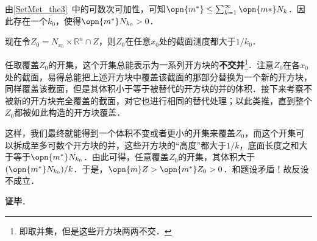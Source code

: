 由\autoref{SetMet_the3}~中的可数次可加性，可知$\opn{m^*}\leq \sum_{k=1}^\infty \opn{m*}N_k$．因此存在一个$k_0$，使得$\opn{m^*}N_{k_0}>0$．

现在令$Z_0=N_{x_0}\times\mathbb{R}^n \cap Z$，则$Z_0$在任意$x_0$处的截面测度都大于$1/k_0$．

任取覆盖$Z_0$的开集，这个开集总能表示为一系列开方块的\textbf{不交并}\footnote{即取并集，但是这些开方块两两不交．}．注意$Z_0$在各$x_0$处的截面，易得总能把上述开方块中覆盖该截面的那部分替换为一个新的开方块，同样覆盖该截面，但是其体积小于等于被替代的开方块的并的体积．接下来考察不被新的开方块完全覆盖的截面，对它也进行相同的替代处理；以此类推，直到整个$Z_0$都被如此构造的开方块覆盖．

这样，我们最终就能得到一个体积不变或者更小的开集来覆盖$Z_0$，而这个开集可以拆成至多可数个开方块的并，这些开方块的“高度”都大于$1/k$，底面长度之和大于等于$\opn{m^*}N_{k_0}$．由此可得，任意覆盖$Z_0$的开集，其体积大于$(\opn{m^*}N_{k_0})/k$．于是，$\opn{m}Z>\opn{m^*}Z_{0}>0$．和题设矛盾！故反设不成立．

\textbf{证毕}．
















